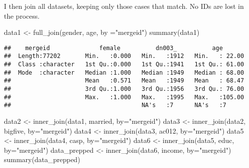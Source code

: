 \documentclass[
]{article}
\newenvironment{Shaded}{\begin{snugshade}}{\end{snugshade}}
\newcommand{\AttributeTok}[1]{\textcolor[rgb]{0.77,0.63,0.00}{#1}}
\newcommand{\CommentTok}[1]{\textcolor[rgb]{0.56,0.35,0.01}{\textit{#1}}}
\newcommand{\DecValTok}[1]{\textcolor[rgb]{0.00,0.00,0.81}{#1}}
\newcommand{\FunctionTok}[1]{\textcolor[rgb]{0.00,0.00,0.00}{#1}}
\newcommand{\NormalTok}[1]{#1}
\newcommand{\OtherTok}[1]{\textcolor[rgb]{0.56,0.35,0.01}{#1}}
\newcommand{\SpecialCharTok}[1]{\textcolor[rgb]{0.00,0.00,0.00}{#1}}
\newcommand{\StringTok}[1]{\textcolor[rgb]{0.31,0.60,0.02}{#1}}
\begin{document}
\begin{Shaded}
\end{Shaded}

I then join all datasets, keeping only those cases that match. No IDs
are lost in the process.

\begin{Shaded}
\begin{Highlighting}[]
\NormalTok{data1 }\OtherTok{\textless{}{-}} \FunctionTok{full\_join}\NormalTok{(gender, age, }\AttributeTok{by =}\StringTok{"mergeid"}\NormalTok{)}
\FunctionTok{summary}\NormalTok{(data1)}
\end{Highlighting}
\end{Shaded}

\begin{verbatim}
##    mergeid              female          dn003_          age        
##  Length:77202       Min.   :0.000   Min.   :1912   Min.   : 22.00  
##  Class :character   1st Qu.:0.000   1st Qu.:1941   1st Qu.: 61.00  
##  Mode  :character   Median :1.000   Median :1949   Median : 68.00  
##                     Mean   :0.571   Mean   :1949   Mean   : 68.47  
##                     3rd Qu.:1.000   3rd Qu.:1956   3rd Qu.: 76.00  
##                     Max.   :1.000   Max.   :1995   Max.   :105.00  
##                                     NA's   :7      NA's   :7
\end{verbatim}

\begin{Shaded}
\begin{Highlighting}[]
\NormalTok{data2 }\OtherTok{\textless{}{-}} \FunctionTok{inner\_join}\NormalTok{(data1, married, }\AttributeTok{by=}\StringTok{"mergeid"}\NormalTok{)}
\NormalTok{data3 }\OtherTok{\textless{}{-}} \FunctionTok{inner\_join}\NormalTok{(data2, bigfive, }\AttributeTok{by=}\StringTok{"mergeid"}\NormalTok{)}
\NormalTok{data4 }\OtherTok{\textless{}{-}} \FunctionTok{inner\_join}\NormalTok{(data3, ac012, }\AttributeTok{by=}\StringTok{"mergeid"}\NormalTok{)}
\NormalTok{data5 }\OtherTok{\textless{}{-}} \FunctionTok{inner\_join}\NormalTok{(data4, casp, }\AttributeTok{by=}\StringTok{"mergeid"}\NormalTok{)}
\NormalTok{data6 }\OtherTok{\textless{}{-}} \FunctionTok{inner\_join}\NormalTok{(data5, educ, }\AttributeTok{by=}\StringTok{"mergeid"}\NormalTok{)}
\NormalTok{data\_prepped }\OtherTok{\textless{}{-}} \FunctionTok{inner\_join}\NormalTok{(data6, income, }\AttributeTok{by=}\StringTok{"mergeid"}\NormalTok{)}
\FunctionTok{summary}\NormalTok{(data\_prepped)}
\end{Highlighting}
\end{Shaded}
\end{document}
